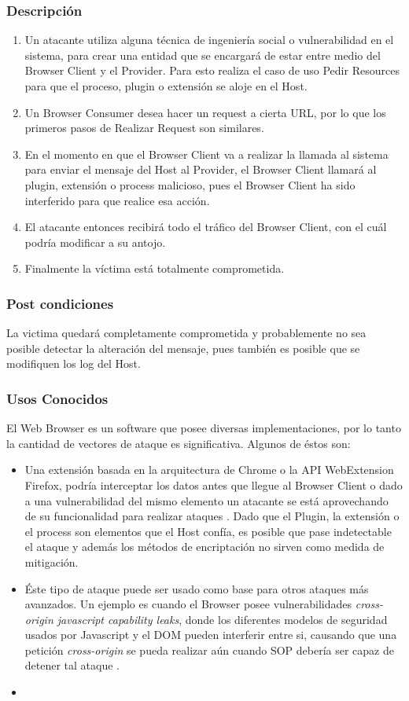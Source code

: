 	\subsubsection{Descripción}
			\begin{enumerate}
				\item Un atacante utiliza alguna técnica de ingeniería social o vulnerabilidad en el sistema, para crear una entidad que se encargará de estar entre medio del Browser Client y el Provider. Para esto realiza el caso de uso Pedir Resources para que el proceso, plugin o extensión se aloje en el Host.
				\item Un Browser Consumer desea hacer un request a cierta URL, por lo que los primeros pasos de Realizar Request son similares.
				\item En el momento en que el Browser Client va a realizar la llamada al sistema para enviar el mensaje del Host al Provider, el Browser Client llamará al plugin, extensión o process malicioso, pues el Browser Client ha sido interferido para que realice esa acción.
				\item El atacante entonces recibirá todo el tráfico del Browser Client, con el cuál podría modificar a su antojo.
				\item Finalmente la víctima está totalmente comprometida.
			\end{enumerate}
	\subsubsection{Post condiciones} La victima quedará completamente comprometida y probablemente no sea posible detectar la alteración del mensaje, pues también es posible que se modifiquen los log del Host.
	\subsubsection{Usos Conocidos} El Web Browser es un software que posee diversas implementaciones, por lo tanto la cantidad de vectores de ataque es significativa. Algunos de éstos son:
			\begin{itemize}
				\item  Una extensión basada en la arquitectura de Chrome o la API WebExtension Firefox, podría interceptar los datos antes que llegue al Browser Client \cite{Paola2006} o dado a una vulnerabilidad del mismo elemento un atacante se está aprovechando de su funcionalidad para realizar ataques \cite{Liu2012, Barth2010}. Dado que el Plugin, la extensión o el process son elementos que el Host confía, es posible que pase indetectable el ataque y además los métodos de encriptación no sirven como medida de mitigación.
				\item Éste tipo de ataque puede ser usado como base para otros ataques más avanzados. Un ejemplo es cuando el Browser posee vulnerabilidades \textit{cross-origin javascript capability leaks}, donde los diferentes modelos de seguridad usados por Javascript y el DOM pueden interferir entre si, causando que una petición \textit{cross-origin} se pueda realizar aún cuando SOP debería ser capaz de detener tal ataque \cite{Barth2009}.
				\item 
			\end{itemize}


